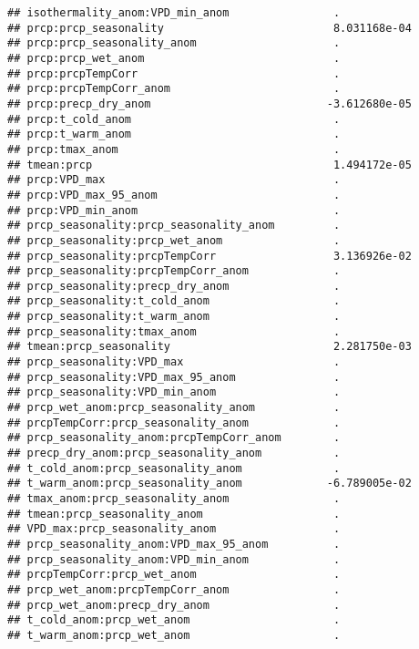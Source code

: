 \documentclass[
]{article}
\begin{document}
\begin{verbatim}
## isothermality_anom:VPD_min_anom                .           
## prcp:prcp_seasonality                          8.031168e-04
## prcp:prcp_seasonality_anom                     .           
## prcp:prcp_wet_anom                             .           
## prcp:prcpTempCorr                              .           
## prcp:prcpTempCorr_anom                         .           
## prcp:precp_dry_anom                           -3.612680e-05
## prcp:t_cold_anom                               .           
## prcp:t_warm_anom                               .           
## prcp:tmax_anom                                 .           
## tmean:prcp                                     1.494172e-05
## prcp:VPD_max                                   .           
## prcp:VPD_max_95_anom                           .           
## prcp:VPD_min_anom                              .           
## prcp_seasonality:prcp_seasonality_anom         .           
## prcp_seasonality:prcp_wet_anom                 .           
## prcp_seasonality:prcpTempCorr                  3.136926e-02
## prcp_seasonality:prcpTempCorr_anom             .           
## prcp_seasonality:precp_dry_anom                .           
## prcp_seasonality:t_cold_anom                   .           
## prcp_seasonality:t_warm_anom                   .           
## prcp_seasonality:tmax_anom                     .           
## tmean:prcp_seasonality                         2.281750e-03
## prcp_seasonality:VPD_max                       .           
## prcp_seasonality:VPD_max_95_anom               .           
## prcp_seasonality:VPD_min_anom                  .           
## prcp_wet_anom:prcp_seasonality_anom            .           
## prcpTempCorr:prcp_seasonality_anom             .           
## prcp_seasonality_anom:prcpTempCorr_anom        .           
## precp_dry_anom:prcp_seasonality_anom           .           
## t_cold_anom:prcp_seasonality_anom              .           
## t_warm_anom:prcp_seasonality_anom             -6.789005e-02
## tmax_anom:prcp_seasonality_anom                .           
## tmean:prcp_seasonality_anom                    .           
## VPD_max:prcp_seasonality_anom                  .           
## prcp_seasonality_anom:VPD_max_95_anom          .           
## prcp_seasonality_anom:VPD_min_anom             .           
## prcpTempCorr:prcp_wet_anom                     .           
## prcp_wet_anom:prcpTempCorr_anom                .           
## prcp_wet_anom:precp_dry_anom                   .           
## t_cold_anom:prcp_wet_anom                      .           
## t_warm_anom:prcp_wet_anom                      .           

\end{verbatim}
\end{document}

